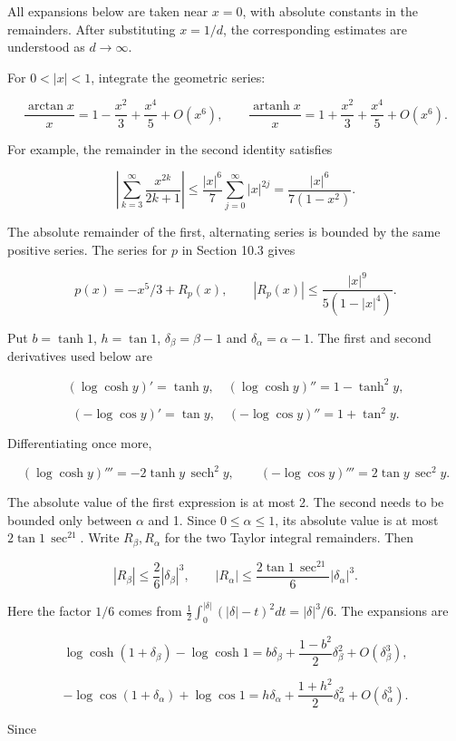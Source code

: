 \documentclass[11pt,a4paper]{article}
\begin{document}
All expansions below are taken near \(x=0\), with absolute constants in the remainders. After substituting \(x=1/d\), the corresponding estimates are understood as \(d\to\infty\).

For \(0<|x|<1\), integrate the geometric series:

\[
\frac{\arctan x}{x}
=1-\frac{x^2}{3}+\frac{x^4}{5}+O(x^6),
\qquad
\frac{\operatorname{artanh}x}{x}
=1+\frac{x^2}{3}+\frac{x^4}{5}+O(x^6).
\]

For example, the remainder in the second identity satisfies

\[
\left|\sum_{k=3}^\infty\frac{x^{2k}}{2k+1}\right|
\le\frac{|x|^6}{7}\sum_{j=0}^\infty|x|^{2j}
=\frac{|x|^6}{7(1-x^2)}.
\]

The absolute remainder of the first, alternating series is bounded by the same positive series. The series for \(p\) in Section 10.3 gives

\[
p(x)=-x^5/3+R_p(x),\qquad
|R_p(x)|\le\frac{|x|^9}{5(1-|x|^4)}.
\]

Put \(b=\tanh1\), \(h=\tan1\), \(\delta_\beta=\beta-1\) and \(\delta_\alpha=\alpha-1\). The first and second derivatives used below are

\[
(\log\cosh y)'=\tanh y,\quad
(\log\cosh y)''=1-\tanh^2y,
\]

\[
(-\log\cos y)'=\tan y,\quad
(-\log\cos y)''=1+\tan^2y.
\]

Differentiating once more,

\[
(\log\cosh y)'''=-2\tanh y\,\operatorname{sech}^2y,\qquad
(-\log\cos y)'''=2\tan y\,\sec^2y.
\]

The absolute value of the first expression is at most 2. The second needs to be bounded only between \(\alpha\) and 1. Since \(0\le\alpha\le1\), its absolute value is at most \(2\tan1\,\sec^21\). Write \(R_\beta,R_\alpha\) for the two Taylor integral remainders. Then

\[
|R_\beta|\le\frac{2}{6}|\delta_\beta|^3,\qquad
|R_\alpha|\le\frac{2\tan1\,\sec^21}{6}|\delta_\alpha|^3.
\]

Here the factor \(1/6\) comes from \(\frac12\int_0^{|\delta|}(|\delta|-t)^2dt=|\delta|^3/6\). The expansions are

\[
\log\cosh(1+\delta_\beta)-\log\cosh1
=b\delta_\beta+\frac{1-b^2}{2}\delta_\beta^2
+O(\delta_\beta^3),
\]

\[
-\log\cos(1+\delta_\alpha)+\log\cos1
=h\delta_\alpha+\frac{1+h^2}{2}\delta_\alpha^2
+O(\delta_\alpha^3).
\]

Since
\end{document}
